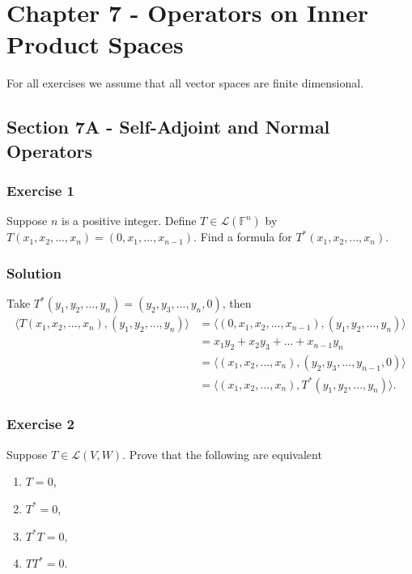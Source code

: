 \section*{Chapter 7 - Operators on Inner Product Spaces}

For all exercises we assume that all vector spaces are finite dimensional.


\subsection*{Section 7A - Self-Adjoint and Normal Operators}

\subsubsection*{Exercise 1}

Suppose $n$ is a positive integer.
Define $T \in \mathcal{L}(\mathbb{F}^n)$ by $T(x_1, x_2, ..., x_n) = (0, x_1, ..., x_{n-1})$.
Find a formula for $T^*(x_1, x_2, ..., x_n)$.

\subsubsection*{Solution}

Take $T^*(y_1, y_2, ..., y_n) = (y_2, y_3, ..., y_n, 0)$, then
\begin{equation*}
    \begin{split}
        \langle T(x_1, x_2, ..., x_n), (y_1, y_2, ..., y_n) \rangle
            &= \langle (0, x_1, x_2, ..., x_{n-1}), (y_1, y_2, ..., y_n) \rangle \\
            &= x_1 y_2 + x_2 y_3 + ... + x_{n-1} y_n \\
            &= \langle (x_1, x_2, ..., x_n), (y_2, y_3, ..., y_{n-1}, 0) \rangle \\
            &= \langle (x_1, x_2, ..., x_n), T^*(y_1, y_2, ..., y_n) \rangle.
    \end{split}
\end{equation*}


\subsubsection*{Exercise 2}

Suppose $T \in \mathcal{L}(V, W)$.
Prove that the following are equivalent
\begin{enumerate}
\item $T = 0$,
\item $T^* = 0$,
\item $T^* T = 0$,
\item $T T^* = 0$.
\end{enumerate}

